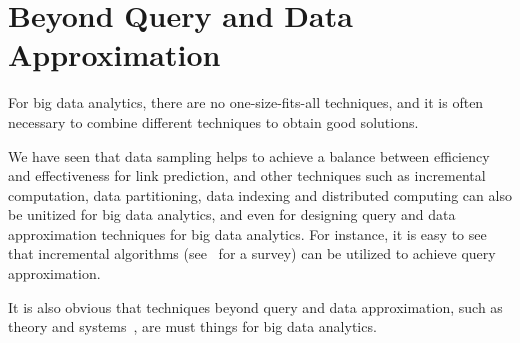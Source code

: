 \section{Beyond Query and Data Approximation}
\label{sec-beyond}

  For big data analytics, there are no one-size-fits-all techniques, and it is often necessary to combine different techniques to obtain good solutions.


We have seen that data sampling helps to achieve a balance between efficiency and effectiveness for link prediction,
and other techniques such as incremental computation, data partitioning, data indexing and distributed computing can
also be unitized for big data analytics, and even for designing query and data approximation techniques for big data analytics.
For instance, it is easy to see that incremental algorithms (see~\cite{Reps96} for a survey) can be utilized to achieve query approximation.

It is also obvious that techniques beyond query and data approximation, such as theory and systems~\cite{FanGN13,Jordan15,ZahariaXWDADMRV16}, are must things for big data analytics.

